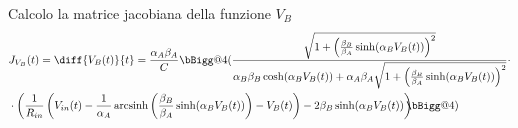 \documentclass[12pt]{article}
\makeatletter
\DeclareMathOperator{\arcsinh}{arcsinh}
\newcommand{\reallybig}{\bBigg@{4}}
\makeatother
\begin{document}
		Calcolo la matrice jacobiana della funzione $V_{B}$
		\begin{equation}
			\label{eq:jacobiana}
			\begin{split}
				&J_{V_{B}}(t) = \diff{V_{B}(t)}{t} = \frac{\alpha_{A}\beta_{A}}{C}\reallybig(\frac{\sqrt{1+\left(\frac{\beta_{B}}{\beta_{A}}\sinh(\alpha_{B}V_{B}(t))\right)^{2}}}{\alpha_{B}\beta_{B}\cosh(\alpha_{B}V_{B}(t))+\alpha_{A}\beta_{A}\sqrt{1+\left(\frac{\beta_{B}}{\beta_{A}}\sinh(\alpha_{B}V_{B}(t))\right)^{2}}}\cdot\\&\cdot\left(\frac{1}{R_{in}}\left(V_{in}(t)-\frac{1}{\alpha_{A}} \arcsinh \left(\frac{\beta_{B}}{\beta_{A}} \sinh(\alpha_{B}V_{B}(t))\right)-V_{B}(t)\right)-2\beta_{B}\sinh(\alpha_{B}V_{B}(t))\right)\hspace{-7px}\reallybig)
			\end{split}
		\end{equation}
	\pagebreak
\end{document}
